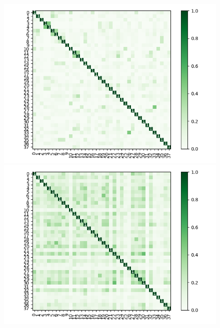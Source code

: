\begin{figure}[!h]
\begin{minipage}[t]{.45\textwidth}
\centering
\includegraphics[width=\textwidth]{figuras/Powergrading/hm-q1.png} 
\end{minipage}%
\begin{minipage}[t]{.45\textwidth}
\centering
\includegraphics[width=\textwidth]{figuras/Powergrading/hm-q3.png} 
\end{minipage}%
\hfill
\begin{minipage}[t]{.45\textwidth}
\centering

\end{minipage}
\end{figure}
